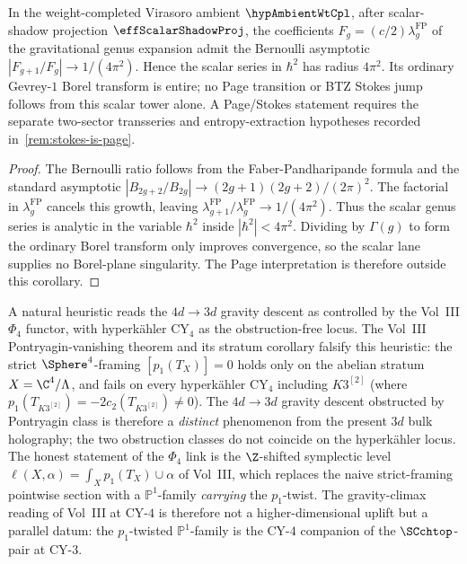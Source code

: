 \begin{corollary}
\ClaimStatusProvedHere
In the weight-completed Virasoro ambient \(\hypAmbientWtCpl\), after
scalar-shadow projection \(\effScalarShadowProj\), the coefficients
$F_{g} = (c/2) \lambda_{g}^{\mathrm{FP}}$ of the gravitational genus
expansion admit the Bernoulli asymptotic
$|F_{g + 1} / F_{g}| \to 1/(4\pi^{2})$. Hence the scalar series in
$\hbar^{2}$ has radius $4\pi^{2}$. Its ordinary Gevrey-$1$ Borel
transform is entire; no Page transition or BTZ Stokes jump follows
from this scalar tower alone. A Page/Stokes statement requires the
separate two-sector transseries and entropy-extraction hypotheses
recorded in~\cref{rem:stokes-is-page}.
\end{corollary}

\begin{proof}
The Bernoulli ratio follows from the Faber-Pandharipande formula and
the standard asymptotic $|B_{2 g + 2} / B_{2 g}| \to (2 g + 1)
(2 g + 2) / (2 \pi)^{2}$. The factorial in
$\lambda_{g}^{\mathrm{FP}}$ cancels this growth, leaving
$\lambda_{g+1}^{\mathrm{FP}}/\lambda_g^{\mathrm{FP}}\to 1/(4\pi^2)$.
Thus the scalar genus series is analytic in the variable $\hbar^2$
inside $|\hbar^2|<4\pi^2$. Dividing by $\Gamma(g)$ to form the
ordinary Borel transform only improves convergence, so the scalar
lane supplies no Borel-plane singularity. The Page interpretation is
therefore outside this corollary.
\end{proof}

\begin{remark}
A natural heuristic reads the $4d \to 3d$ gravity descent as
controlled by the Vol~III $\Phi_{4}$ functor, with hyperk\"ahler
$\mathrm{CY}_{4}$ as the obstruction-free locus. The Vol~III
Pontryagin-vanishing theorem and its stratum corollary falsify this
heuristic: the strict $\Sphere^{4}$-framing
$[p_{1}(T_{X})] = 0$ holds only on the abelian stratum
$X = \C^{4} / \Lambda$, and fails on every hyperk\"ahler
$\mathrm{CY}_{4}$ including $K3^{[2]}$ (where
$p_{1}(T_{K3^{[2]}}) = -2 c_{2}(T_{K3^{[2]}}) \neq 0$). The $4d \to 3d$
gravity descent obstructed by Pontryagin class is therefore a
\emph{distinct} phenomenon from the present $3d$ bulk holography; the
two obstruction classes do not coincide on the hyperk\"ahler locus.
The honest statement of the $\Phi_{4}$ link is the
$\Z$-shifted symplectic level $\ell(X, \alpha) =
\int_{X} p_{1}(T_{X}) \cup \alpha$ of Vol~III, which replaces the
naive strict-framing pointwise section with a $\mathbb{P}^{1}$-family
\emph{carrying} the $p_{1}$-twist. The gravity-climax reading of
Vol~III at CY-$4$ is therefore not a higher-dimensional uplift but a
parallel datum: the $p_{1}$-twisted $\mathbb{P}^{1}$-family is the
CY-$4$ companion of the $\SCchtop$-pair at CY-$3$.
\end{remark}

